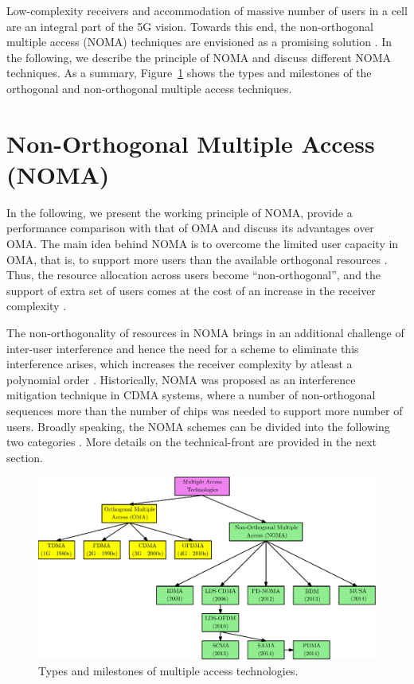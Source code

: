 \begin{multicols}{2}
Low-complexity receivers and accommodation of massive number of users in a cell are an integral part of the 5G vision. Towards this end, the non-orthogonal multiple access (NOMA) techniques are envisioned as a promising solution \cite{Chen_ComMag_2018}. In the following, we describe the principle of NOMA and discuss different NOMA techniques. As a summary, Figure~\ref{Fig_OMAandNOMA} shows the types and milestones of the orthogonal and non-orthogonal multiple access techniques.

\section{Non-Orthogonal Multiple Access (NOMA)}  \label{SecNOMA}
In the following, we present the working principle of NOMA, provide a performance comparison with that of OMA and discuss its advantages over OMA. The main idea behind NOMA is to overcome the limited user capacity in OMA, that is, to support more users than the available orthogonal resources \cite{Dai_ComMag_2015}. Thus, the resource allocation across users become ``non-orthogonal'', and the support of extra set of users comes at the cost of an increase in the receiver complexity \cite{Yuan_ComMag_2016}.

The non-orthogonality of resources in NOMA brings in an additional challenge of inter-user interference and hence the need for a scheme to eliminate this interference arises, which increases the receiver complexity by atleast a polynomial order \cite{Ding_ComMag_2017}. Historically, NOMA was proposed as an interference mitigation technique in CDMA systems, where a number of non-orthogonal sequences more than the number of chips was needed to support more number of users. Broadly speaking, the NOMA schemes can be divided into the following two categories \cite{Dai_CST_2018}. More details on the technical-front are provided in the next section.
\end{multicols}


\begin{figure}[ht]
\begin{center}
 \includegraphics[scale=0.75]{src/Figures/chap5/NOMA_AllTechnologies.eps}
 \caption{Types and milestones of multiple access technologies.} \label{Fig_OMAandNOMA}
\end{center}
\end{figure}

